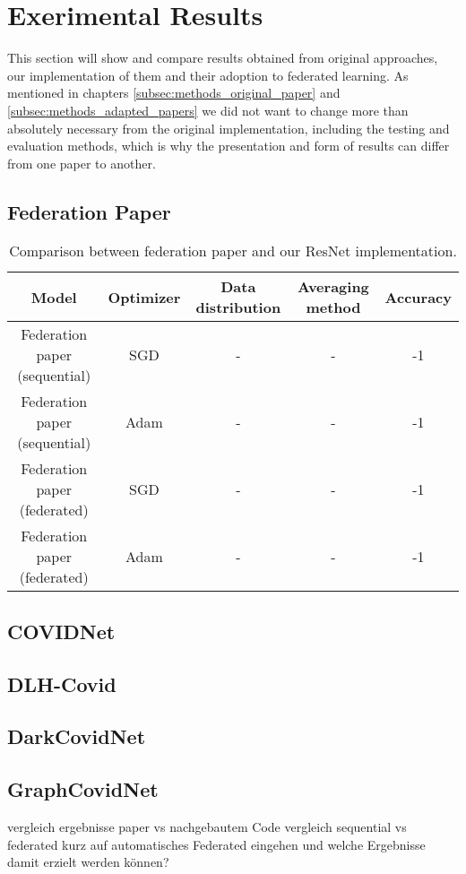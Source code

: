 \section{Exerimental Results}
This section will show and compare results obtained from original approaches, our implementation of them and their adoption to federated learning. As mentioned in chapters \ref{subsec:methods_original_paper} and \ref{subsec:methods_adapted_papers} we did not want to change more than absolutely necessary from the original implementation, including the testing and evaluation methods, which is why the presentation and form of results can differ from one paper to another.

\subsection{Federation Paper}

\begin{table}[]
    \small
    \centering
    \caption{Comparison between federation paper and our ResNet implementation.}
    \begin{tabular}{c|c|c|c|c}
        Model & Optimizer & Data distribution & Averaging method & Accuracy \\
        \hline
        Federation paper (sequential) & SGD & - & - & -1\\
        Federation paper (sequential) & Adam & - & - & -1\\
        Federation paper (federated) & SGD & - & - & -1\\
        Federation paper (federated) & Adam & - & - & -1\\
    \end{tabular}
    \label{tab:results_federation_paper}
\end{table}

\subsection{COVIDNet}
\subsection{DLH-Covid}
\subsection{DarkCovidNet}
\subsection{GraphCovidNet}

vergleich ergebnisse paper vs nachgebautem Code
vergleich sequential vs federated
kurz auf automatisches Federated eingehen und welche Ergebnisse damit erzielt werden können?
